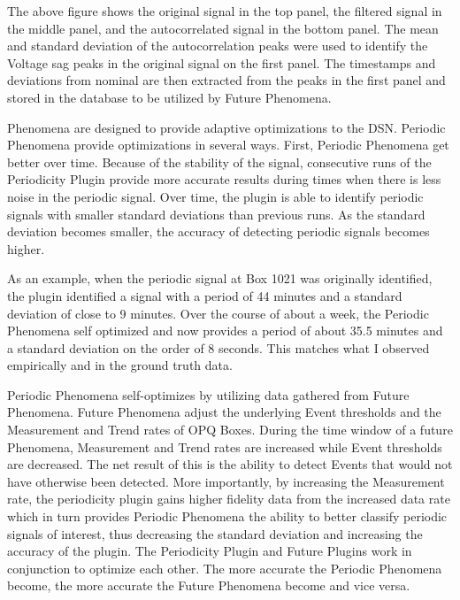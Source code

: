 The above figure shows the original signal in the top panel, the filtered signal in the middle panel, and the autocorrelated signal in the bottom panel. The mean and standard deviation of the autocorrelation peaks were used to identify the Voltage sag peaks in the original signal on the first panel. The timestamps and deviations from nominal are then extracted from the peaks in the first panel and stored in the database to be utilized by Future Phenomena.

Phenomena are designed to provide adaptive optimizations to the DSN. Periodic Phenomena provide optimizations in several ways. First, Periodic Phenomena get better over time. Because of the stability of the signal, consecutive runs of the Periodicity Plugin provide more accurate results during times when there is less noise in the periodic signal. Over time, the plugin is able to identify periodic signals with smaller standard deviations than previous runs. As the standard deviation becomes smaller, the accuracy of detecting periodic signals becomes higher.

As an example, when the periodic signal at Box 1021 was originally identified, the plugin identified a signal with a period of 44 minutes and a standard deviation of close to 9 minutes. Over the course of about a week, the Periodic Phenomena self optimized and now provides a period of about 35.5 minutes and a standard deviation on the order of 8 seconds. This matches what I observed empirically and in the ground truth data.

Periodic Phenomena self-optimizes by utilizing data gathered from Future Phenomena. Future Phenomena adjust the underlying Event thresholds and the Measurement and Trend rates of OPQ Boxes. During the time window of a future Phenomena, Measurement and Trend rates are increased while Event thresholds are decreased. The net result of this is the ability to detect Events that would not have otherwise been detected. More importantly, by increasing the Measurement rate, the periodicity plugin gains higher fidelity data from the increased data rate which in turn provides Periodic Phenomena the ability to better classify periodic signals of interest, thus decreasing the standard deviation and increasing the accuracy of the plugin. The Periodicity Plugin and Future Plugins work in conjunction to optimize each other. The more accurate the Periodic Phenomena become, the more accurate the Future Phenomena become and vice versa.

